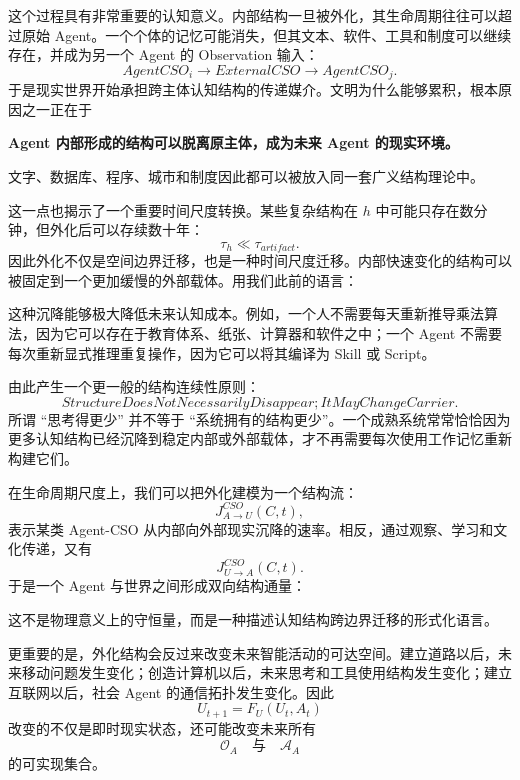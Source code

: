 这个过程具有非常重要的认知意义。内部结构一旦被外化，其生命周期往往可以超过原始 Agent。一个个体的记忆可能消失，但其文本、软件、工具和制度可以继续存在，并成为另一个 Agent 的 Observation 输入：
\[
AgentCSO_i
\rightarrow
ExternalCSO
\rightarrow
AgentCSO_j.
\]
于是现实世界开始承担跨主体认知结构的传递媒介。文明为什么能够累积，根本原因之一正在于
\begin{statementbox}
\centering\bfseries
Agent 内部形成的结构可以脱离原主体，成为未来 Agent 的现实环境。
\end{statementbox}
文字、数据库、程序、城市和制度因此都可以被放入同一套广义结构理论中。

这一点也揭示了一个重要时间尺度转换。某些复杂结构在 $h$ 中可能只存在数分钟，但外化后可以存续数十年：
\[
\tau_{h}
\ll
\tau_{artifact}.
\]
因此外化不仅是空间边界迁移，也是一种时间尺度迁移。内部快速变化的结构可以被固定到一个更加缓慢的外部载体。用我们此前的语言：
\begin{statementbox}
\centering
{}
\end{statementbox}
这种沉降能够极大降低未来认知成本。例如，一个人不需要每天重新推导乘法算法，因为它可以存在于教育体系、纸张、计算器和软件之中；一个 Agent 不需要每次重新显式推理重复操作，因为它可以将其编译为 Skill 或 Script。

由此产生一个更一般的结构连续性原则：
\[
\boxed{
StructureDoesNotNecessarilyDisappear;
ItMayChangeCarrier.
}
\]
所谓 ``思考得更少'' 并不等于 ``系统拥有的结构更少''。一个成熟系统常常恰恰因为更多认知结构已经沉降到稳定内部或外部载体，才不再需要每次使用工作记忆重新构建它们。

在生命周期尺度上，我们可以把外化建模为一个结构流：
\[
J_{A\rightarrow U}^{CSO}(C,t),
\]
表示某类 Agent-CSO 从内部向外部现实沉降的速率。相反，通过观察、学习和文化传递，又有
\[
J_{U\rightarrow A}^{CSO}(C,t).
\]
于是一个 Agent 与世界之间形成双向结构通量：
\begin{statementbox}
\centering
{}
\end{statementbox}
这不是物理意义上的守恒量，而是一种描述认知结构跨边界迁移的形式化语言。

更重要的是，外化结构会反过来改变未来智能活动的可达空间。建立道路以后，未来移动问题发生变化；创造计算机以后，未来思考和工具使用结构发生变化；建立互联网以后，社会 Agent 的通信拓扑发生变化。因此
\[
U_{t+1}
=
F_U(U_t,A_t)
\]
改变的不仅是即时现实状态，还可能改变未来所有
\[
\mathcal O_A
\quad\text{与}\quad
\mathcal A_A
\]
的可实现集合。

